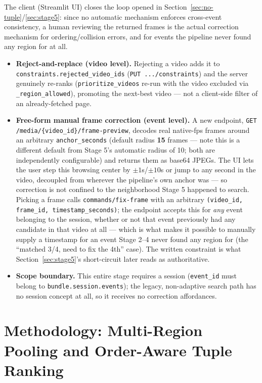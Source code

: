 \documentclass[11pt]{article}
\newcommand{\code}[1]{\texttt{\small #1}}
\begin{document}
The client (Streamlit UI) closes the loop opened in
Section~\ref{sec:no-tuple}/\ref{sec:stage5}: since no automatic mechanism
enforces cross-event consistency, a human reviewing the returned frames is
the actual correction mechanism for ordering/collision errors, and for
events the pipeline never found any region for at all.

\begin{itemize}
\item \textbf{Reject-and-replace (video level).} Rejecting a video adds it to
  \code{constraints.rejected\_video\_ids} (\code{PUT .../constraints}) and the
  server genuinely re-ranks (\code{prioritize\_videos} re-run with the video
  excluded via \code{\_region\_allowed}), promoting the next-best video ---
  not a client-side filter of an already-fetched page.
\item \textbf{Free-form manual frame correction (event level).} A new
  endpoint, \code{GET /media/\{video\_id\}/frame-preview}, decodes real
  native-fps frames around an arbitrary \code{anchor\_seconds} (default
  radius \textbf{15} frames --- note this is a different default from Stage
  5's automatic radius of 10; both are independently configurable) and
  returns them as base64 JPEGs. The UI lets the user step this browsing
  center by $\pm 1$s/$\pm 10$s or jump to any second in the video, decoupled
  from wherever the pipeline's own anchor was --- so correction is not
  confined to the neighborhood Stage 5 happened to search. Picking a frame
  calls \code{commands/fix-frame} with an arbitrary
  \code{(video\_id, frame\_id, timestamp\_seconds)}; the endpoint accepts
  this for \emph{any} event belonging to the session, whether or not that
  event previously had any candidate in that video at all --- which is what
  makes it possible to manually supply a timestamp for an event Stage 2--4
  never found any region for (the ``matched 3/4, need to fix the 4th''
  case). The written constraint is what Section~\ref{sec:stage5}'s
  short-circuit later reads as authoritative.
\item \textbf{Scope boundary.} This entire stage requires a session
  (\code{event\_id} must belong to \code{bundle.session.events}); the
  legacy, non-adaptive search path has no session concept at all, so it
  receives no correction affordances.
\end{itemize}

\section{Methodology: Multi-Region Pooling and Order-Aware Tuple Ranking}
\label{sec:tuple-ranking}
\end{document}
